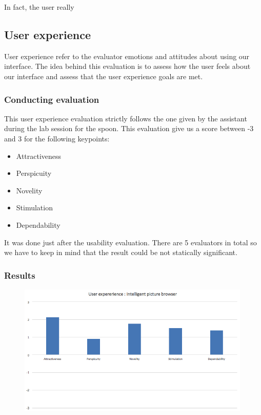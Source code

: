 \documentclass[11pt,a4paper]{article}
\begin{document}
In fact, the user really


\subsection{User experience}

User experience refer to the evaluator emotions and attitudes about using our interface. The idea behind this evaluation is to assess how the user feels about our interface and assess that the user experience goals are met.


\subsubsection{Conducting evaluation}

This user experience evaluation strictly follows the one given by the assistant during the lab session for the spoon. This evaluation give us a score between -3 and 3 for the following keypoints:
\begin{itemize}
	\item Attractiveness
	\item Perspicuity
	\item Novelity
	\item Stimulation
	\item Dependability
\end{itemize}

It was done just after the usability evaluation. There are 5 evaluators in total so we have to keep in mind that the result could be not statically significant.

\subsubsection{Results}


\begin{figure}[H]
   \centering
   \includegraphics[width=0.99\textwidth]{img/ux.png}
\end{figure}
\end{document}
